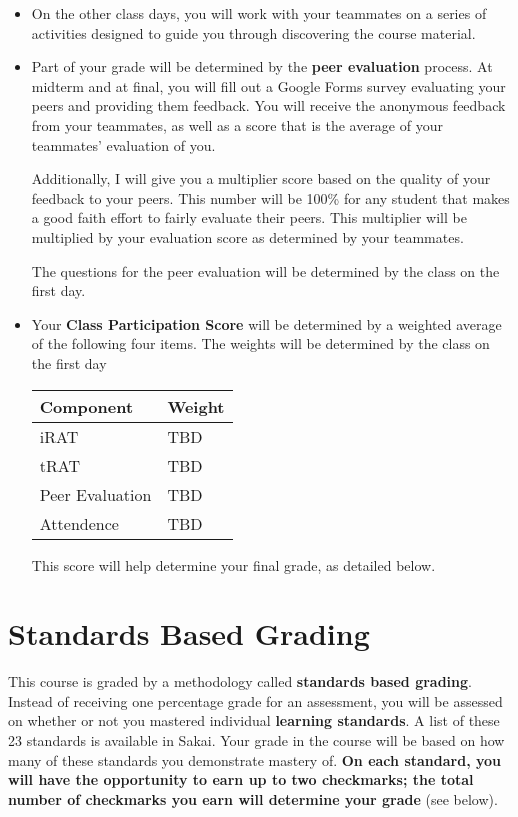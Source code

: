\documentclass[letterpaper]{article}
\begin{document}
{\begin{itemize}
\item On the other class days, you will work with your teammates on a series of activities designed to guide you through discovering the course material.

\item Part of your grade will be determined by the {\bf peer evaluation} process.  At midterm and at final, you will fill out a Google Forms survey evaluating your peers and providing them feedback.  You will receive the anonymous feedback from your teammates, as well as a score that is the average of your teammates' evaluation of you.

Additionally, I will give you a multiplier score based on the quality of your feedback to your peers.  This number will be 100\% for any student that makes a good faith effort to fairly evaluate their peers.  This multiplier will be multiplied by your evaluation score as determined by your teammates.

The questions for the peer evaluation will be determined by the class on the first day.

\item Your {\bf Class Participation Score} will be determined by a weighted average of the following four items.  The weights will be determined by the class on the first day

\begin{center}
\begin{tabular}{l|l}
Component & Weight \\ \hline \hline
iRAT & TBD \\ \hline
tRAT & TBD\\ \hline
Peer Evaluation & TBD \\ \hline
Attendence & TBD\\ \hline

\end{tabular}
\end{center}

This score will help determine your final grade, as detailed below.
\end{itemize}
}

\section*{\fontsize{12}{15}\selectfont Standards Based Grading}
This course is graded by a methodology called {\bf standards based grading}.  Instead of receiving one percentage grade for an assessment, you will be assessed on whether or not you mastered individual {\bf learning standards}.  A list of these 23 standards is available in Sakai.  Your grade in the course will be based on how many of these standards you demonstrate mastery of.  {\bf On each standard, you will have the opportunity to earn up to two checkmarks; the total number of checkmarks you earn will determine your grade} (see below).
\end{document}
